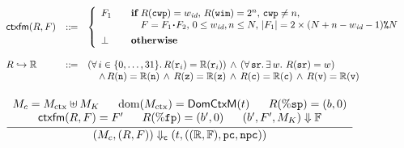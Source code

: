 \begin{figure}[!t]
    \centering
    \[
        \begin{array}{lcl}
            \textsf{ctxfm}(R, F) & ::\!\!{=} & 
            \left\{
            \begin{array}{ll}
                F_1 & \quad \textbf{if} \
                R(\texttt{cwp}) = w_{\textit{id}}, \, 
                R(\texttt{wim}) = 2^{n}, \, 
                \texttt{cwp} \neq n, \\
                & \qquad
                F = F_1 \!\bm{\cdot}\! F_2, \, 
                0 \leq w_{\textit{id}}, n \leq N, \, 
                | F_1 | = 2 \times 
                    {(N + n - w_{\textit{id}}- 1)}\texttt{\%}{N} \\
                \\[-8pt]
                \perp & \quad \textbf{otherwise}
            \end{array} 
            \right. \\
            \\
            {R}\hookrightarrow{\mathbb{R}} & ::\!\!{=} & 
            (\forall \, i \in \{ 0, \dots, 31 \}. \, 
                R(\texttt{r}_{i}) = \mathbb{R}(\texttt{r}_{i}))
                \, \land \, 
                (\forall \, \texttt{sr}. \, \exists \, w. \  
                R(\texttt{sr}) = w) \\
            & & \quad \, \land \, 
            R(\texttt{n}) = \mathbb{R}(\texttt{n}) \, \land \, 
            R(\texttt{z}) = \mathbb{R}(\texttt{z}) \, \land \, 
            R(\texttt{c}) = \mathbb{R}(\texttt{c}) \, \land \, 
            R(\texttt{v}) = \mathbb{R}(\texttt{v}) \\
        \end{array}
    \]
    \[
        \begin{array}{c}
            \\[-5pt]
            \infer
            {
                \curStRel{(\Mem_c, (\RFile, \Wstack))}
                    {(\thrdid, ((\hRfile, \hWstk), \pc, \npc))}
            }
            {
                \begin{array}{c}
                    \Mem_c = \Mem_{\text{ctx}} \uplus \Mem_K 
                    \quad \ \ 
                    \dom(\Mem_{\text{ctx}}) = \DomCtx{(\thrdid)}
                    \quad \ \ 
                    \RFile(\spreg) = (\block, 0) 
                    \\
                    \ctxfm(\RFile, \Wstack) = \Wstack' \quad \ \ 
                    \RFile(\fpreg) = (\block', 0) \quad \ \ 
                    \stkRel{(\block', \Wstack', \Mem_K)}{\hWstk} 

\end{array}}
\end{array}\]
\end{figure}

